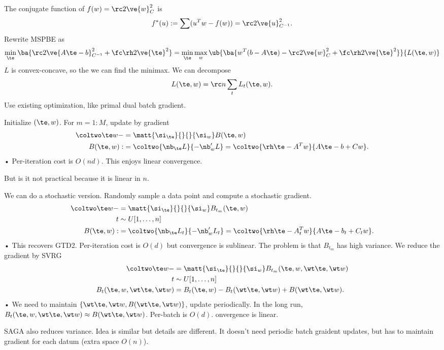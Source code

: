 The conjugate function of $f(w)=\rc 2\ve{w}_C^2$ is
$$
f^*(u):=\sum(u^Tw - f(w))=\rc 2\ve{u}_{C^{-1}}^2.
$$
Rewrite MSPBE as
\begin{align}
\min_\te \ba{\rc 2\ve{A\te - b}_{C^{-1}}^2 + \fc\rh2\ve{\te}^2} = \min_\te\max_w\ub{\ba{w^T(b-A\te) -\rc 2\ve{w}_C^2 + \fc \rh2 \ve{\te}^2}}{L(\te,w)}
\end{align}
$L$ is convex-concave, so the we can find the minimax. We can decompose
$$
L(\te, w) = \rc n \sum_t L_t(\te, w).
$$
Use existing optimization, like primal dual batch gradient.

Initialize $(\te, w)$. For $m=1:M$, update by gradient
\begin{align}
\coltwo \te w -&=\matt{\si_\te}{}{}{\si_w} B(\te,w)\\
B(\te, w) :&= \coltwo{\nb_\te L}{-\nb_w' L} = \coltwo{\rh\te - A^Tw}{A\te - b + Cw}.
\end{align}•
Per-iteration cost is $O(nd)$. This enjoys linear convergence.

But is it not practical because it is linear in $n$.

We can do a stochastic version. Randomly sample a data point and compute a stochastic gradient.
\begin{align}
\coltwo \te w -&=\matt{\si_\te}{}{}{\si_w} B_{t_m}(\te,w)\\
t&\sim U[1,\ldots, n]\\
B(\te, w) :&= \coltwo{\nb_\te L_t}{-\nb_w' L_t} = \coltwo{\rh\te - A_t^Tw}{A\te - b_t + C_tw}.
\end{align}•
This recovers GTD2. Per-iteration cost is $O(d)$ but convergence is sublinear. The problem is that $B_{t_m}$ has high variance. We reduce the gradient by SVRG
\begin{align}
\coltwo \te w -&=\matt{\si_\te}{}{}{\si_w} B_{t_m}(\te,w, \wt \te, \wt w)\\
t&\sim U[1,\ldots, n]\\
B_t(\te, w, \wt \te, \wt w) &= B_t(\te, w)-B_t(\wt \te, \wt w) + B(\wt \te, \wt w).
\end{align}•
We need to maintain $\{\wt \te, \wt w, B(\wt \te, \wt w)\}$, update periodically. In the long run, $B_t(\te, w, \wt \te, \wt w) \approx B(\wt \te, \wt w)$. Per-batch is $O(d)$. onvergence is linear.

SAGA also reduces variance. Idea is similar but details are different. It doesn't need periodic batch graident updates, but has to maintain gradient for each datum (extra space $O(n)$).

